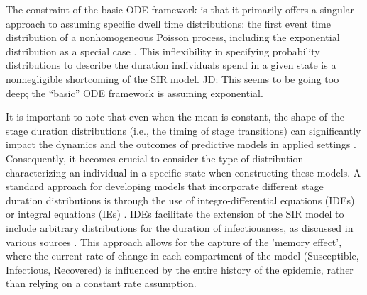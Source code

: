 \documentclass[12pt]{article}
\begin{document}
The constraint of the basic ODE framework is that it primarily offers a singular approach to assuming specific dwell time distributions: the first event time distribution of a nonhomogeneous Poisson process, including the exponential distribution as a special case \cite{hurtado2019generalizations}. This inflexibility in specifying probability distributions to describe the duration individuals spend in a given state is a nonnegligible shortcoming of the SIR model. JD: This seems to be going too deep; the “basic” ODE framework is assuming exponential.

It is important to note that even when the mean is constant, the shape of the stage duration distributions (i.e., the timing of stage transitions) can significantly impact the dynamics and the outcomes of predictive models in applied settings \cite{krylova2013effects}\cite{keeling2002understanding}\cite{wearing2005appropriate}\cite{nguyen2008noise}. Consequently, it becomes crucial to consider the type of distribution characterizing an individual in a specific state when constructing these models. A standard approach for developing models that incorporate different stage duration distributions is through the use of integro-differential equations (IDEs) or integral equations (IEs) \cite{hurtado2019generalizations}\cite{kermack1927contribution}\cite{hethcote1980integral}. IDEs facilitate the extension of the SIR model to include arbitrary distributions for the duration of infectiousness, as discussed in various sources \cite{feng2000endemic}\cite{hethcote1980integral}\cite{ma2006generality}. This approach allows for the capture of the 'memory effect', where the current rate of change in each compartment of the model (Susceptible, Infectious, Recovered) is influenced by the entire history of the epidemic, rather than relying on a constant rate assumption.
\end{document}
